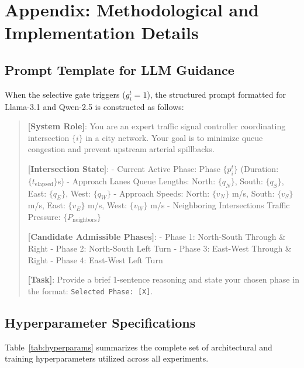 \documentclass[11pt,a4paper,twocolumn]{article}
\begin{document}



\newpage
\appendix
\section{Appendix: Methodological and Implementation Details}
\label{sec:appendix}

\subsection{Prompt Template for LLM Guidance}
When the selective gate triggers ($g_i^t = 1$), the structured prompt formatted for Llama-3.1 and Qwen-2.5 is constructed as follows:

\begin{quote}
\small
\textbf{[System Role]}: You are an expert traffic signal controller coordinating intersection $\{i\}$ in a city network. Your goal is to minimize queue congestion and prevent upstream arterial spillbacks.

\textbf{[Intersection State]}:
- Current Active Phase: Phase $\{p_i^t\}$ (Duration: $\{t_{\text{elapsed}}\}$s)
- Approach Lanes Queue Lengths: North: $\{q_N\}$, South: $\{q_S\}$, East: $\{q_E\}$, West: $\{q_W\}$
- Approach Speeds: North: $\{v_N\}$ m/s, South: $\{v_S\}$ m/s, East: $\{v_E\}$ m/s, West: $\{v_W\}$ m/s
- Neighboring Intersections Traffic Pressure: $\{P_{\text{neighbors}}\}$

\textbf{[Candidate Admissible Phases]}:
- Phase 1: North-South Through \& Right
- Phase 2: North-South Left Turn
- Phase 3: East-West Through \& Right
- Phase 4: East-West Left Turn

\textbf{[Task]}: Provide a brief 1-sentence reasoning and state your chosen phase in the format: \texttt{Selected Phase: [X]}.
\end{quote}

\subsection{Hyperparameter Specifications}
Table~\ref{tab:hyperparams} summarizes the complete set of architectural and training hyperparameters utilized across all experiments.
\end{document}
